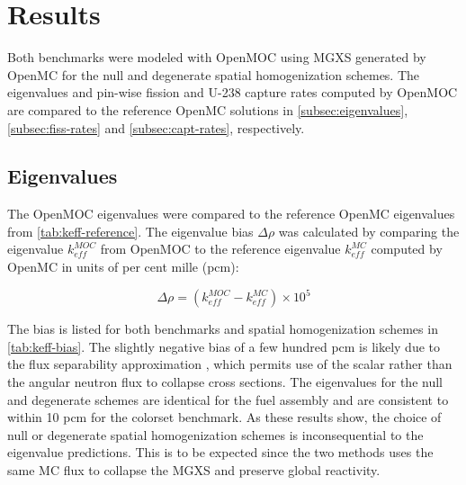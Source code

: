 \section{Results}
\label{sec:results}

Both benchmarks were modeled with OpenMOC using MGXS generated by OpenMC for the null and degenerate spatial homogenization schemes. The eigenvalues and pin-wise fission and U-238 capture rates computed by OpenMOC are compared to the reference OpenMC solutions in \autoref{subsec:eigenvalues}, \autoref{subsec:fiss-rates} and \autoref{subsec:capt-rates}, respectively.


\subsection{Eigenvalues}
\label{subsec:eigenvalues}

The OpenMOC eigenvalues were compared to the reference OpenMC eigenvalues from \autoref{tab:keff-reference}. The eigenvalue bias $\Delta\rho$ was calculated by comparing the eigenvalue $k_{eff}^{MOC}$ from OpenMOC to the reference eigenvalue $k_{eff}^{MC}$ computed by OpenMC in units of per cent mille (pcm):

\begin{equation}
\label{eqn:delta-rho}
\Delta\rho = \left(k_{eff}^{MOC} - k_{eff}^{MC}\right) \times 10^{5}
\end{equation}

The bias is listed for both benchmarks and spatial homogenization schemes in \autoref{tab:keff-bias}. The slightly negative bias of a few hundred pcm is likely due to the flux separability approximation \citep{boyd2017sph}, which permits use of the scalar rather than the angular neutron flux to collapse cross sections. The eigenvalues for the null and degenerate schemes are identical for the fuel assembly and are consistent to within 10 pcm for the colorset benchmark. As these results show, the choice of null or degenerate spatial homogenization schemes is inconsequential to the eigenvalue predictions. This is to be expected since the two methods uses the same MC flux to collapse the MGXS and preserve global reactivity.


